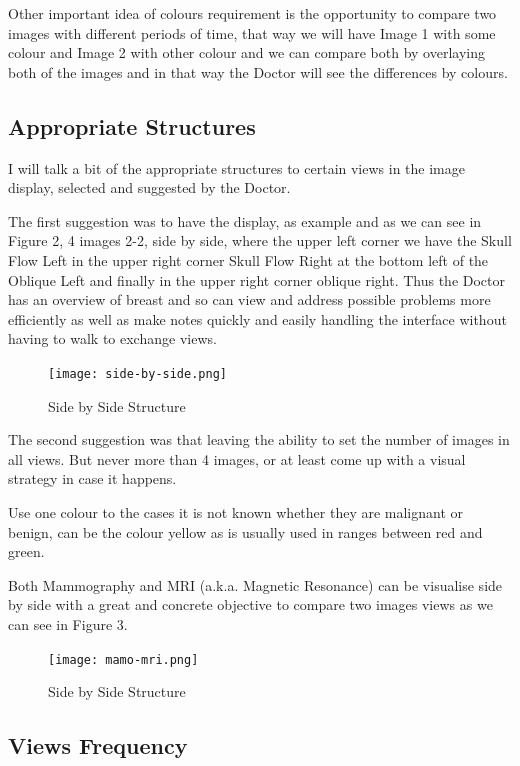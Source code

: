 Other important idea of colours requirement is the opportunity to compare two images with different periods of time, that way we will have Image 1 with some colour and Image 2 with other colour and we can compare both by overlaying both of the images and in that way the Doctor will see the differences by colours.

\subsection{Appropriate Structures}

I will talk a bit of the appropriate structures to certain views in the image display, selected and suggested by the Doctor.

The first suggestion was to have the display, as example and as we can see in Figure 2, 4 images 2-2, side by side, where the upper left corner we have the Skull Flow Left in the upper right corner Skull Flow Right at the bottom left of the Oblique Left and finally in the upper right corner oblique right. Thus the Doctor has an overview of breast and so can view and address possible problems more efficiently as well as make notes quickly and easily handling the interface without having to walk to exchange views.

\begin{figure}[!hbt]
\centering
\texttt{[image: side-by-side.png]}
\caption{\label{fig:frog}Side by Side Structure}
\end{figure}

The second suggestion was that leaving the ability to set the number of images in all views. But never more than 4 images, or at least come up with a visual strategy in case it happens.

Use one colour to the cases it is not known whether they are malignant or benign, can be the colour yellow as is usually used in ranges between red and green.

Both Mammography and MRI (a.k.a. Magnetic Resonance) can be visualise side by side with a great and concrete objective to compare two images views as we can see in Figure 3.

\begin{figure}[!hbt]
\centering
\texttt{[image: mamo-mri.png]}
\caption{\label{fig:frog}Side by Side Structure}
\end{figure}

\subsection{Views Frequency}

